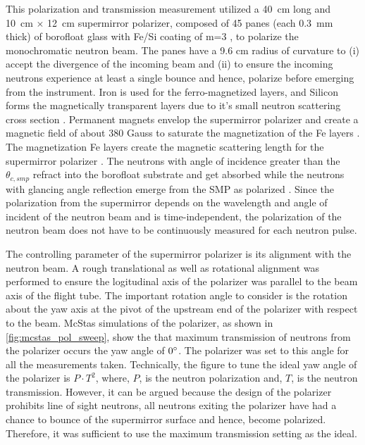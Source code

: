 This polarization and transmission measurement utilized a 40~cm long and 10~cm $\times$ 12~cm supermirror polarizer, composed of 45 panes (each 0.3~mm thick) of borofloat glass with Fe/Si coating of m=3 \cite{Balascuta2012}, to polarize the monochromatic neutron beam. The panes have a 9.6 cm radius of curvature to (i) accept the divergence of the incoming beam and (ii) to ensure the incoming neutrons experience at least a single bounce and hence, polarize before emerging from the instrument. Iron is used for the ferro-magnetized layers, and Silicon forms the magnetically transparent layers due to it's small neutron scattering cross section \cite{Balascuta2012, Schanzer2016}. Permanent magnets envelop the supermirror polarizer and create a magnetic field of about 380 Gauss to saturate the magnetization of the Fe layers \cite{Balascuta2012}. The magnetization Fe layers create the magnetic scattering length for the supermirror polarizer \cite{Schanzer2016, Mezei1976}. The neutrons with angle of incidence greater than the $\theta_{c,smp}$ refract into the borofloat substrate and get absorbed while the neutrons with glancing angle reflection emerge from the SMP as polarized \cite{Balascuta2012}. Since the polarization from the supermirror depends on the wavelength and angle of incident of the neutron beam and is time-independent, the polarization of the neutron beam does not have to be continuously measured for each neutron pulse. %

The controlling parameter of the supermirror polarizer is its alignment with the neutron beam. A rough translational as well as rotational alignment was performed to ensure the logitudinal axis of the polarizer was parallel to the beam axis of the flight tube. The important rotation angle to consider is the rotation about the yaw axis at the pivot of the upstream end of the polarizer with respect to the beam. McStas simulations of the polarizer, as shown in \cref{fig:mcstas_pol_sweep}, show the that maximum transmission of neutrons from the polarizer occurs the yaw angle of $0 \degree$. The polarizer was set to this angle for all the measurements taken. Technically, the figure to tune the ideal yaw angle of the polarizer is $P \cdot T^2$, where, $P$, is the neutron polarization and, $T$, is the neutron transmission. However, it can be argued because the design of the polarizer prohibits line of sight neutrons, all neutrons exiting the polarizer have had a chance to bounce of the supermirror surface and hence, become polarized. Therefore, it was sufficient to use the maximum transmission setting as the ideal.  

